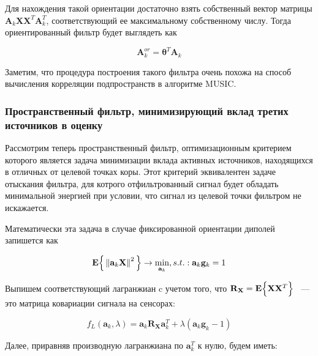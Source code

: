 Для нахождения такой ориентации достаточно взять собственный вектор матрицы
$\mathbf{A}_k \mathbf{X}\mathbf{X}^T \mathbf{A}_k^T$,
соответствующий ее максимальному собственному числу.
Тогда ориентированный фильтр будет выглядеть как

\begin{equation}
    \mathbf{A}_{k}^{or} = \mathbf{\theta}^T \mathbf{A}_k
\end{equation}

Заметим, что процедура построения такого фильтра очень похожа на способ
вычисления корреляции подпространств в алгоритме MUSIC.

\subsubsection{Пространственный фильтр, минимизирующий вклад третих источников в оценку}

Рассмотрим теперь пространственный фильтр,
оптимизационным критерием которого является задача минимизации
вклада активных источников, находящихся в отличных от целевой точках коры.
Этот критерий эквивалентен задаче отыскания фильтра, для котрого отфильтрованный
сигнал будет обладать минимальной энергией при условии, что
сигнал из целевой точки фильтром не искажается.

Математически эта задача в случае фиксированной ориентации диполей запишется как

\begin{equation}
    \mathbf{E}\Big\{\left\lVert\mathbf{a}_k \mathbf{X}\right\rVert^2\Big\}
    \rightarrow \underset{\mathbf{a}_k}{\min},
    s.t.: \mathbf{a}_k \mathbf{g}_k = 1
    \label{lcmv_objective_nonreg}
\end{equation}

Выпишем соответствующий лагранжиан c учетом того,
что $\mathbf{R}_{\mathbf{X}} = \mathbf{E}\Big\{\mathbf{X}\mathbf{X}^T\Big\}$
~--- это матрица ковариации сигнала на сенсорах:

\begin{equation}
    f_L(\mathbf{a}_k, \lambda) = \mathbf{a}_k \mathbf{R}_{\mathbf{X}} \mathbf{a}_k^T + \lambda (\mathbf{a}_k \mathbf{g}_k - 1)
\end{equation}


Далее, приравняв производную лагранжиана по $\mathbf{a}_k ^ T$ к нулю, будем иметь:

